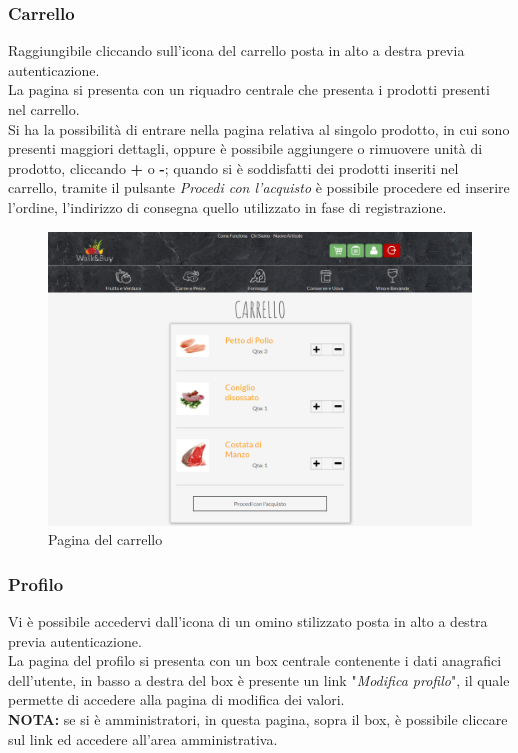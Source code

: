	\subsubsection{Carrello}
	Raggiungibile cliccando sull'icona del carrello posta in alto a destra previa autenticazione.\\
	La pagina si presenta con un riquadro centrale che presenta i prodotti presenti nel carrello.\\
	Si ha la possibilità di entrare nella pagina relativa al singolo prodotto, in cui sono presenti maggiori dettagli, oppure è possibile aggiungere o rimuovere unità di prodotto, cliccando \textbf{+} o \textbf{-}; quando si è soddisfatti dei prodotti inseriti nel carrello, tramite il pulsante \textit{Procedi con l'acquisto} è possibile procedere ed inserire l'ordine, l'indirizzo di consegna quello utilizzato in fase di registrazione.
	\begin{figure}[H]
		\includegraphics[width=\linewidth]{res/img/carrello}
		\caption{Pagina del carrello}
		\label{Carrello}
	\end{figure}
	\subsubsection{Profilo}
	Vi è possibile accedervi dall'icona di un omino stilizzato posta in alto a destra previa autenticazione.\\
	La pagina del profilo si presenta con un box centrale contenente i dati anagrafici dell'utente, in basso a destra del box è presente un link "\textit{Modifica profilo}", il quale permette di accedere alla pagina di modifica dei valori.\\
	\textbf{NOTA:} se si è amministratori, in questa pagina, sopra il box, è possibile cliccare sul link ed accedere all'area amministrativa.

